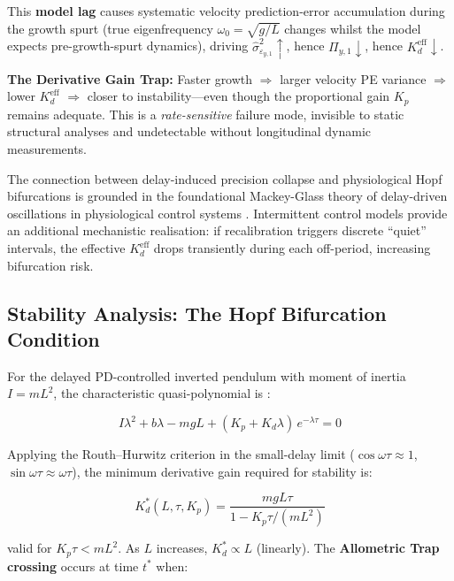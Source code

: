 \documentclass[12pt, letterpaper]{article}
\newcommand{\Kd}{K_d}
\newcommand{\Kdcrit}{K_d^{*}}
\newcommand{\Kdeff}{K_d^{\mathrm{eff}}}
\newcommand{\Piy}{\Pi_{y,1}}
\newcommand{\epsy}{\varepsilon_{y,1}}
\begin{document}
This \textbf{model lag} causes systematic velocity prediction-error accumulation
during the growth spurt (true eigenfrequency $\omega_0 = \sqrt{g/L}$ changes
whilst the model expects pre-growth-spurt dynamics), driving
$\hat{\sigma}^{2}_{\epsy}\!\uparrow$, hence $\Piy\!\downarrow$, hence
$\Kdeff\!\downarrow$.

\begin{tcolorbox}[mechbox]
\textbf{The Derivative Gain Trap:}
Faster growth $\Rightarrow$ larger velocity PE variance $\Rightarrow$
lower $\Kdeff$ $\Rightarrow$ closer to instability---even though the
proportional gain $K_p$ remains adequate.
This is a \emph{rate-sensitive} failure mode, invisible to static structural
analyses and undetectable without longitudinal dynamic measurements.
\end{tcolorbox}

The connection between delay-induced precision collapse and physiological
Hopf bifurcations is grounded in the foundational Mackey-Glass theory of
delay-driven oscillations in physiological control systems
\citep{MackeyGlass1977}. Intermittent control models \citep{Bottaro2008} provide
an additional mechanistic realisation: if recalibration triggers discrete
``quiet'' intervals, the effective $\Kdeff$ drops transiently during each
off-period, increasing bifurcation risk.

\subsection{Stability Analysis: The Hopf Bifurcation Condition}

For the delayed PD-controlled inverted pendulum with moment of inertia
$I = mL^{2}$, the characteristic quasi-polynomial is \citep{Insperger2011}:

\begin{equation}
  I\lambda^{2} + b\lambda - mgL
    + (K_p + \Kd\lambda)\,e^{-\lambda\tau} = 0
  \label{eq:chareq}
\end{equation}

Applying the Routh--Hurwitz criterion in the small-delay limit
($\cos\omega\tau \approx 1$, $\sin\omega\tau \approx \omega\tau$), the
minimum derivative gain required for stability is:

\begin{equation}
  \boxed{\Kdcrit(L, \tau, K_p) =
    \frac{mgL\tau}{1 - K_p\tau/(mL^{2})}}
  \label{eq:Kdcrit}
\end{equation}

valid for $K_p\tau < mL^{2}$. As $L$ increases, $\Kdcrit \propto L$ (linearly).
The \textbf{Allometric Trap crossing} occurs at time $t^{*}$ when:
\end{document}
